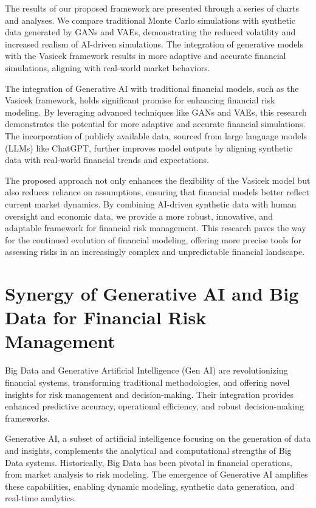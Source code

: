 \documentclass[a4paper,headinclude=on,footinclude=on,12pt,oneside]{scrbook}
\begin{document}
	
	The results of our proposed framework are presented through a series of charts and analyses. We compare traditional Monte Carlo simulations with synthetic data generated by GANs and VAEs, demonstrating the reduced volatility and increased realism of AI-driven simulations. The integration of generative models with the Vasicek framework results in more adaptive and accurate financial simulations, aligning with real-world market behaviors.
	
	
	The integration of Generative AI with traditional financial models, such as the Vasicek framework, holds significant promise for enhancing financial risk modeling. By leveraging advanced techniques like GANs and VAEs, this research demonstrates the potential for more adaptive and accurate financial simulations. The incorporation of publicly available data, sourced from large language models (LLMs) like ChatGPT, further improves model outputs by aligning synthetic data with real-world financial trends and expectations.
	
	The proposed approach not only enhances the flexibility of the Vasicek model but also reduces reliance on assumptions, ensuring that financial models better reflect current market dynamics. By combining AI-driven synthetic data with human oversight and economic data, we provide a more robust, innovative, and adaptable framework for financial risk management. This research paves the way for the continued evolution of financial modeling, offering more precise tools for assessing risks in an increasingly complex and unpredictable financial landscape.
	
	
	\chapter{Synergy of Generative AI and Big Data for Financial Risk Management}
	
	Big Data and Generative Artificial Intelligence (Gen AI) are revolutionizing financial systems, transforming traditional methodologies, and offering novel insights for risk management and decision-making. Their integration provides enhanced predictive accuracy, operational efficiency, and robust decision-making frameworks.
	
	Generative AI, a subset of artificial intelligence focusing on the generation of data and insights, complements the analytical and computational strengths of Big Data systems. Historically, Big Data has been pivotal in financial operations, from market analysis to risk modeling. The emergence of Generative AI amplifies these capabilities, enabling dynamic modeling, synthetic data generation, and real-time analytics.
	
\end{document}
